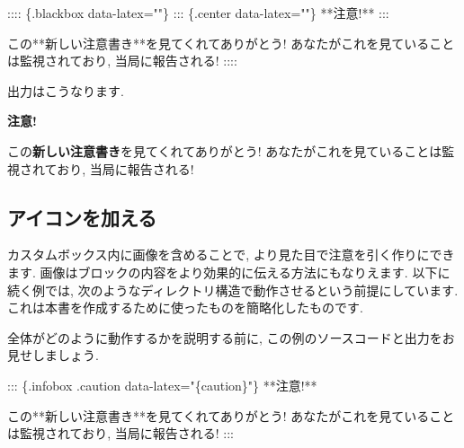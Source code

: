 \documentclass[
  11pt,
  lualatex,ja=standard,jafont=noto]{bxjsreport}
\newenvironment{Shaded}{\begin{snugshade}}{\end{snugshade}}
\newcommand{\NormalTok}[1]{#1}
\begin{document}
\begin{Shaded}
\begin{Highlighting}[]
\NormalTok{:::: \{.blackbox data{-}latex=""\}}
\NormalTok{::: \{.center data{-}latex=""\}}
\NormalTok{**注意!**}
\NormalTok{:::}

\NormalTok{この**新しい注意書き**を見てくれてありがとう! あなたがこれを見ていることは監視されており, 当局に報告される!}
\NormalTok{::::}
\end{Highlighting}
\end{Shaded}

出力はこうなります.

\begin{blackbox}

\begin{center}
\textbf{注意!}

\end{center}

この\textbf{新しい注意書き}を見てくれてありがとう! あなたがこれを見ていることは監視されており, 当局に報告される!

\end{blackbox}

\hypertarget{block-image}{%
\subsection{アイコンを加える}\label{block-image}}

カスタムボックス内に画像を含めることで, より見た目で注意を引く作りにできます. 画像はブロックの内容をより効果的に伝える方法にもなりえます. 以下に続く例では, 次のようなディレクトリ構造で動作させるという前提にしています. これは本書を作成するために使ったものを簡略化したものです.


全体がどのように動作するかを説明する前に, この例のソースコードと出力をお見せしましょう.

\begin{Shaded}
\begin{Highlighting}[]
\NormalTok{::: \{.infobox .caution data{-}latex="\{caution\}"\}}
\NormalTok{**注意!**}

\NormalTok{この**新しい注意書き**を見てくれてありがとう! あなたがこれを見ていることは監視されており, 当局に報告される!}
\NormalTok{:::}
\end{Highlighting}
\end{Shaded}
\end{document}
